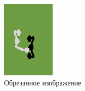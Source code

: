 \documentclass{letask}
\begin{document}
\begin{figure}[H]
\begin{center}
\begin{minipage}[h]{0.4\linewidth}
\includegraphics[width=1\linewidth]{observation_reshaped.png}
\caption{Обрезанное изображение}
\label{observation_reshaped}
\end{minipage}
\end{center}
\end{figure}
\end{document}
